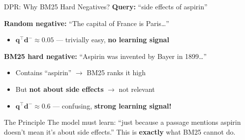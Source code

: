 \documentclass[aspectratio=169]{beamer}
\newif\ifanimated
\newcommand{\cpause}{\ifanimated\pause\fi}
\newcommand{\vq}{\mathbf{q}}
\newcommand{\vd}{\mathbf{d}}
\begin{document}
\begin{frame}{DPR: Why BM25 Hard Negatives?}
\textbf{Query:} ``side effects of aspirin''

\vspace{1em}

\textbf{Random negative:} ``The capital of France is Paris\ldots''
\begin{itemize}
    \item $\vq^\top \vd^- \approx 0.05$ --- trivially easy, \textbf{no learning signal}
\end{itemize}\cpause

\cpause
\vspace{0.5em}

\textbf{BM25 hard negative:} ``Aspirin was invented by Bayer in 1899\ldots''
\begin{itemize}
    \item Contains ``aspirin'' $\to$ BM25 ranks it high
    \item But \textbf{not about side effects} $\to$ not relevant
    \item $\vq^\top \vd^- \approx 0.6$ --- confusing, \textbf{strong learning signal!}
\end{itemize}\cpause

\cpause
\vspace{1em}

\begin{alertblock}{The Principle}
The model must learn: ``just because a passage mentions aspirin doesn't mean it's about side effects.'' This is \textbf{exactly} what BM25 cannot do.
\end{alertblock}
\end{frame}
\end{document}
